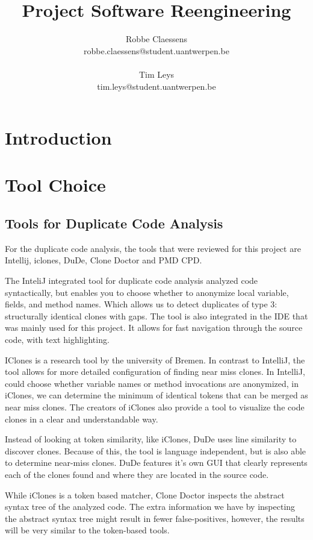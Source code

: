 \documentclass[]{article}
\title{Project Software Reengineering}
\author{Robbe Claessens \\ robbe.claessens@student.uantwerpen.be \\ \\Tim Leys\\tim.leys@student.uantwerpen.be}
\begin{document}
\maketitle



\section{Introduction}

\section{Tool Choice}

\subsection{Tools for Duplicate Code Analysis}
For the duplicate code analysis, the tools that were reviewed for this project are Intellij, iclones, DuDe, Clone Doctor and PMD CPD. 

The InteliJ integrated tool for duplicate code analysis analyzed code syntactically, but enables you to choose whether to anonymize local variable, fields, and method names. Which allows us to detect duplicates of type 3: structurally identical clones with gaps. The tool is also integrated in the IDE that was mainly used for this project. It allows for fast navigation through the source code, with text highlighting. 

IClones is a research tool by the university of Bremen. In contrast to IntelliJ, the tool allows for more detailed configuration of finding near miss clones. In IntelliJ, could choose whether variable names or method invocations are anonymized, in iClones, we can determine the minimum of identical tokens that can be merged as near miss clones. The creators of iClones also provide a tool to visualize the code clones in a clear and understandable way.

Instead of looking at token similarity, like iClones, DuDe uses line similarity to discover clones. Because of this, the tool is language independent, but is also able to determine near-miss clones. DuDe features it's own GUI that clearly represents each of the clones found and where they are located in the source code.

While iClones is a token based matcher, Clone Doctor inspects the abstract syntax tree of the analyzed code. The extra information we have by inspecting the abstract syntax tree might result in fewer false-positives, however, the results will be very similar to the token-based tools. 
\end{document}
